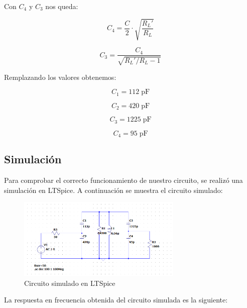 Con $C_4$ y $C_3$ nos queda:

\begin{equation}
    C_4 = \frac{C}{2} \cdot \sqrt{\frac{R_L'}{R_L}}
\end{equation}

\begin{equation}
    C_3 = \frac{C_4}{\sqrt{R_L' / R_L - 1}}
\end{equation}

Remplazando los valores obtenemos:

\begin{equation}
    \boxed{C_1 = 112\; \text{pF}}
\end{equation}

\begin{equation}
    \boxed{C_2 = 420\; \text{pF}}
\end{equation}

\begin{equation}
    \boxed{C_3 = 1225\; \text{pF}}
\end{equation}

\begin{equation}
    \boxed{C_4 = 95\; \text{pF}}
\end{equation}

\newpage
\subsection{Simulación}

Para comprobar el correcto funcionamiento de nuestro circuito, se realizó una simulación en LTSpice. A continuación se muestra el circuito simulado:

\begin{figure}[h]
    \centering
    \includegraphics[width=0.7\textwidth]{Imagenes/circuito.png}
    \caption{Circuito simulado en LTSpice}
\end{figure}

La respuesta en frecuencia obtenida del circuito simulada es la siguiente:

